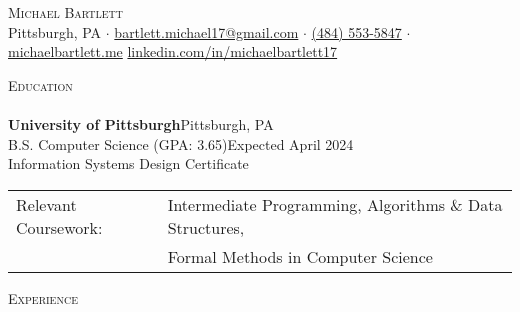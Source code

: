 \documentclass[letterpaper]{article}
\newcommand{\lineunder} {
    \vspace*{-8pt} \\
    \hspace*{-18pt} \hrulefill \\
}
\newcommand{\header} [1] {
    {\hspace*{-18pt}\vspace*{6pt} \textsc{#1}}
    \vspace*{-6pt} \lineunder
}
\begin{document}
\vspace*{-40pt}



\vspace*{-10pt}
\begin{center}
	{\Huge \scshape {Michael Bartlett}}\\
	Pittsburgh, PA $\cdot$ \href{mailto:bartlett.michael17@gmail.com}{bartlett.michael17@gmail.com} $\cdot$ \href{tel:4845535847}{(484) 553-5847} $\cdot$ \href{http://michaelbartlett.me}{michaelbartlett.me} \href{https://www.linkedin.com/in/michaelbartlett17/}{linkedin.com/in/michaelbartlett17} \\
\end{center}

\header{Education}
\textbf{University of Pittsburgh}\hfill Pittsburgh, PA\\
B.S. Computer Science (GPA: 3.65)\hfill Expected April 2024\\
Information Systems Design Certificate
\begin{tabular}{@{} l l }
Relevant Coursework: & Intermediate Programming, Algorithms \& Data Structures, \\
& Formal Methods in Computer Science
\end{tabular}
\vspace{2mm}

\header{Experience}
\vspace{1mm}
\end{document}
